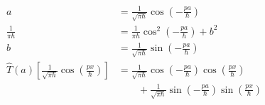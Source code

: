 \documentclass{article}
\begin{document}
\begin{enumerate}
\begin{align*}
          a                                                                                          & = \frac{1}{\sqrt{\pi \hbar}} \cos \left( -\frac{p a}{\hbar} \right)                                              \\
          \frac{1}{\pi \hbar}                                                                        & = \frac{1}{\pi \hbar} \cos^2 \left( -\frac{p a}{\hbar} \right) + b^2                                             \\
          b                                                                                          & = \frac{1}{\sqrt{\pi \hbar}} \sin \left( -\frac{p a}{\hbar} \right)                                              \\
          \hat{T}(a) \left[ \frac{1}{\sqrt{\pi \hbar}} \cos \left( \frac{p x}{\hbar} \right) \right] & = \frac{1}{\sqrt{\pi \hbar}} \cos \left( -\frac{p a}{\hbar} \right) \cos \left( \frac{p x}{\hbar} \right)        \\
                                                                                                     & \qquad + \frac{1}{\sqrt{\pi \hbar}} \sin \left( -\frac{p a}{\hbar} \right) \sin \left( \frac{p x}{\hbar} \right)
        \end{align*}
\end{enumerate}

\subsection{}
\end{document}
